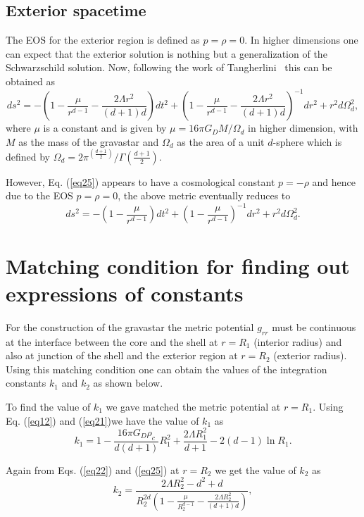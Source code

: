\documentclass[preprint,12pt]{elsarticle}
\begin{document}
\subsection{Exterior spacetime}
The EOS for the exterior region is defined as $p=\rho=0$. In higher dimensions
one can expect that the exterior solution is nothing but a generalization of the Schwarzschild solution.
Now, following the work of Tangherlini~\cite{Tangherlini1963} this can be obtained
as
\begin{equation}
ds ^2 = - \left(1 - \frac{\mu}{ r^{d-1}}-\frac{ 2\Lambda r^2}{(d+1)d}\right)
dt^2 + \left(1 - \frac{\mu}{ r^{d-1}}-\frac{ 2\Lambda r^2}{(d+1)d}\right)^{-1} dr^2 +r^2 d \Omega_d^2,\label{eq25}
\end{equation}
where $\mu$ is a constant and is given by $\mu={16\pi G_D M}/{\Omega_d}$ in higher
dimension, with $M$ as the mass of the gravastar and ${\Omega}_d$ as the area
of a unit $d$-sphere which is defined by ${\Omega}_d ={2 \pi^{(\frac{d+1}{2})}}/{\Gamma(\frac{d+1}{2})}$.

However, Eq. (\ref{eq25}) appears to have a cosmological constant $p = -\rho$ and hence due to the EOS $p=\rho=0$, the above metric eventually reduces to
\begin{equation}
ds ^2 = - \left(1 - \frac{\mu}{ r^{d-1}}\right)
dt^2 + \left(1 - \frac{\mu}{ r^{d-1}}\right)^{-1} dr^2 +r^2 d \Omega_d^2.\label{eq25a}
\end{equation}



\section{Matching condition for finding out expressions of constants}
For the construction of the gravastar the metric potential $g_{rr}$ must be continuous at the interface between the core and the shell at $r=R_1$ (interior radius) and also at junction of the shell and the exterior region at $r=R_2$ (exterior radius). Using this matching condition one can obtain the values of the integration constants $k_1$ and $k_2$ as shown below.

To find the value of $k_1$ we gave matched the metric potential at $r=R_1$.
Using Eq. (\ref{eq12}) and (\ref{eq21})we have the value of $k_1$ as
\begin{equation}
k_1=1-\frac{16\pi G_D\rho_c}{d(d+1)}R_1^2+\frac{2\Lambda R_1^2}{d+1}-2(d-1)\ln R_1.\label{eq27}
\end{equation}

Again from Eqs. (\ref{eq22}) and (\ref{eq25}) at $r=R_2$ we get the value of $k_2$ as
\begin{equation}
k_2=\frac{2\Lambda R_2^2 -d^2+d}{{R_2^{2d}}\left(1 - \frac{\mu}{ R_2^{d-1}}-\frac{ 2\Lambda R_2^2}{(d+1)d}\right)},\label{eq28}
\end{equation}
\end{document}
